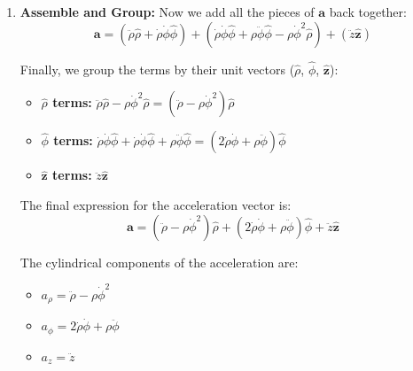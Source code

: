 \documentclass[11pt, a4paper]{article} %
\begin{document}
\begin{enumerate}
    \begin{itemize}
        \item \textbf{Term 1:} $\frac{d}{dt}(\dot{\rho} \hat{\rho}) = \ddot{\rho} \hat{\rho} + \dot{\rho} \dot{\hat{\rho}} = \ddot{\rho} \hat{\rho} + \dot{\rho}(\dot{\phi} \hat{\phi})$
        \item \textbf{Term 2:} $\frac{d}{dt}(\rho \dot{\phi} \hat{\phi}) = (\dot{\rho})(\dot{\phi} \hat{\phi}) + (\rho)(\ddot{\phi} \hat{\phi}) + (\rho \dot{\phi})(\dot{\hat{\phi}})$
        $$= \dot{\rho} \dot{\phi} \hat{\phi} + \rho \ddot{\phi} \hat{\phi} + \rho \dot{\phi}(-\dot{\phi} \hat{\rho})$$
        $$= \dot{\rho} \dot{\phi} \hat{\phi} + \rho \ddot{\phi} \hat{\phi} - \rho \dot{\phi}^2 \hat{\rho}$$
        \item \textbf{Term 3:} $\frac{d}{dt}(\dot{z} \hat{\mathbf{z}}) = \ddot{z} \hat{\mathbf{z}} + \dot{z} \dot{\hat{\mathbf{z}}} = \ddot{z} \hat{\mathbf{z}} + \dot{z}(0) = \ddot{z} \hat{\mathbf{z}}$
    \end{itemize}

    \item \textbf{Assemble and Group:}
    Now we add all the pieces of $\mathbf{a}$ back together:
    $$\mathbf{a} = \left( \ddot{\rho} \hat{\rho} + \dot{\rho} \dot{\phi} \hat{\phi} \right) + \left( \dot{\rho} \dot{\phi} \hat{\phi} + \rho \ddot{\phi} \hat{\phi} - \rho \dot{\phi}^2 \hat{\rho} \right) + \left( \ddot{z} \hat{\mathbf{z}} \right)$$
    
    Finally, we group the terms by their unit vectors ($\hat{\rho}$, $\hat{\phi}$, $\hat{\mathbf{z}}$):
    \begin{itemize}
        \item \textbf{$\hat{\rho}$ terms:} $\ddot{\rho} \hat{\rho} - \rho \dot{\phi}^2 \hat{\rho} = (\ddot{\rho} - \rho \dot{\phi}^2) \hat{\rho}$
        \item \textbf{$\hat{\phi}$ terms:} $\dot{\rho} \dot{\phi} \hat{\phi} + \dot{\rho} \dot{\phi} \hat{\phi} + \rho \ddot{\phi} \hat{\phi} = (2 \dot{\rho} \dot{\phi} + \rho \ddot{\phi}) \hat{\phi}$
        \item \textbf{$\hat{\mathbf{z}}$ terms:} $\ddot{z} \hat{\mathbf{z}}$
    \end{itemize}

    The final expression for the acceleration vector is:
    $$\mathbf{a} = (\ddot{\rho} - \rho \dot{\phi}^2) \hat{\rho} + (2 \dot{\rho} \dot{\phi} + \rho \ddot{\phi}) \hat{\phi} + \ddot{z} \hat{\mathbf{z}}$$
    
    The cylindrical components of the acceleration are:
    \begin{itemize}
        \item $a_{\rho} = \ddot{\rho} - \rho \dot{\phi}^2$
        \item $a_{\phi} = 2 \dot{\rho} \dot{\phi} + \rho \ddot{\phi}$
        \item $a_z = \ddot{z}$
    \end{itemize}
\end{enumerate}
\end{document}
